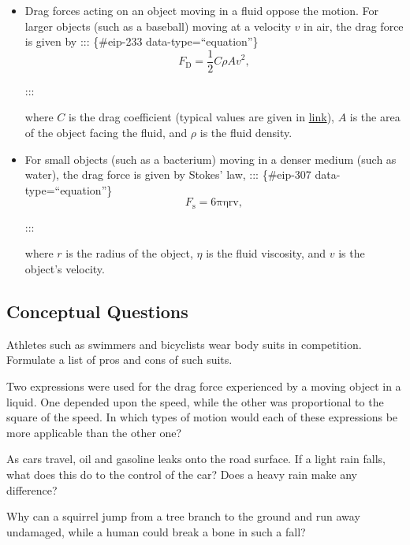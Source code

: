 \documentclass[
]{book}
\newenvironment{conceptual-questions}{}{}
\begin{document}
\begin{itemize}
\item
  \protect\hypertarget{import-auto-id1165298595649}{}{Drag forces acting on an object moving in a fluid oppose the
  motion. For larger objects (such as a baseball) moving at a velocity
  \(v\) in air, the drag force is given
  by}
  ::: \{\#eip-233 data-type=``equation''\}
  \[{{F_{\text{D}} = \frac{1}{2}}{C\rho Av}^{2}},\]

  :::

  where \(C{}\) is the drag coefficient (typical values are given in
  \protect\hyperlink{import-auto-id1165298535568}{link}), \(A{}\)
  is the area of the object facing the fluid, and \(\rho{}\) is the
  fluid density.
\item
  \protect\hypertarget{import-auto-id1165298748357}{}{For small objects (such as a bacterium) moving in a denser medium
  (such as water), the drag force is given by Stokes'
  law,}
  ::: \{\#eip-307 data-type=``equation''\}
  \[{{{F_{\text{s}} = 6}\text{πηrv}},}{}\]

  :::

  where \(r{}\) is the radius of the object,
  \emph{}\(\eta{}\) is the fluid viscosity, and
  \(v{}\) is the object's velocity.
\end{itemize}

\hypertarget{fs-id1165298645318}{}
\begin{conceptual-questions}

\hypertarget{conceptual-questions-19}{%
\subsection{Conceptual Questions}\label{conceptual-questions-19}}

\hypertarget{fs-id1165298899670}{}
\leavevmode\hypertarget{fs-id1165298822562}{}%
Athletes such as swimmers and bicyclists wear body suits in competition.
Formulate a list of pros and cons of such suits.

\hypertarget{fs-id1165298622189}{}
\leavevmode\hypertarget{fs-id1165296540091}{}%
Two expressions were used for the drag force experienced by a moving
object in a liquid. One depended upon the speed, while the other was
proportional to the square of the speed. In which types of motion would
each of these expressions be more applicable than the other one?

\hypertarget{fs-id1165296261672}{}
\leavevmode\hypertarget{fs-id1165298797706}{}%
As cars travel, oil and gasoline leaks onto the road surface. If a light
rain falls, what does this do to the control of the car? Does a heavy
rain make any difference?

\hypertarget{fs-id1165296346967}{}
\leavevmode\hypertarget{fs-id1165298550956}{}%
Why can a squirrel jump from a tree branch to the ground and run away
undamaged, while a human could break a bone in such a fall?

\end{conceptual-questions}
\end{document}
